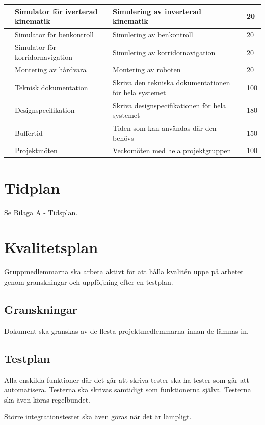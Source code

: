 \documentclass[a4paper,titlepage,12pt]{article}
\newcounter{aktNr}
\newcommand{\nextAktNr}{\stepcounter{aktNr}\arabic{aktNr}}
\begin{document}
\begin{longtable}[c]{ c p{4cm} p{6cm} p{2cm} p{2cm}}
		\nextAktNr{} & Simulator för iverterad kinematik & Simulering av inverterad kinematik &  & 20 \\ \midrule
		\nextAktNr{} & Simulator för benkontroll & Simulering av benkontroll &  & 20 \\ \midrule
		\nextAktNr{} & Simulator för korridornavigation & Simulering av korridornavigation &  & 20 \\ \midrule
		\nextAktNr{} & Montering av hårdvara & Montering av roboten &  & 20 \\ \midrule
		\nextAktNr{} & Teknisk dokumentation & Skriva den tekniska dokumentationen för hela
                                                            systemet &  & 100 \\ \midrule
		\nextAktNr{} & Designspecifikation & Skriva designspecifikationen för hela systemet &  & 180 \\ \midrule
		\nextAktNr{} & Buffertid & Tiden som kan användas där den behövs &  & 150 \\ \midrule
		\nextAktNr{} & Projektmöten & Veckomöten med hela projektgruppen &  & 100 \\ \midrule
	\end{longtable}

	
	\section{Tidplan}
    Se Bilaga A - Tidsplan.
	
	\section{Kvalitetsplan}
	Gruppmedlemmarna ska arbeta aktivt för att hålla kvalitén uppe på arbetet genom 
	granskningar och uppföljning efter en testplan.
	
	\subsection{Granskningar}
	Dokument ska granskas av de flesta projektmedlemmarna innan de lämnas in.
	
	\subsection{Testplan}
	Alla enskilda funktioner där det går att skriva tester ska ha tester som går att
	automatisera. Testerna ska skrivas samtidigt som funktionerna själva. Testerna ska
	även köras regelbundet. 

	Större integrationstester ska även göras när det är lämpligt.
	
\end{document}
